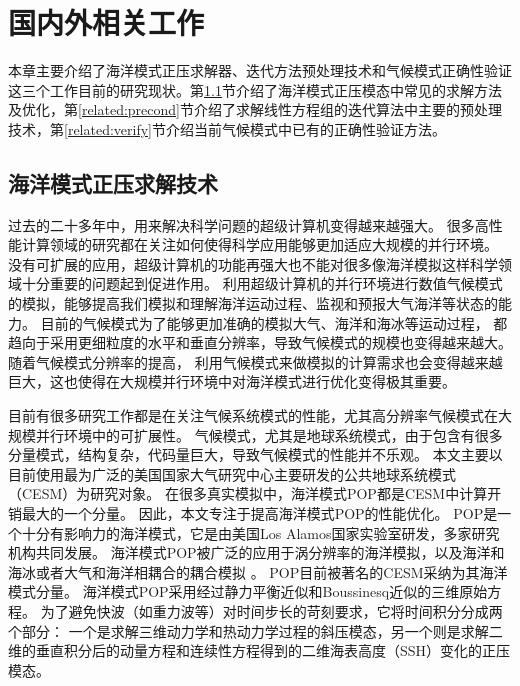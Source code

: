 \chapter{国内外相关工作}
\label{cha:related}
本章主要介绍了海洋模式正压求解器、迭代方法预处理技术和气候模式正确性验证这三个工作目前的研究现状。第\ref{solver:Backgroud}节介绍了海洋模式正压模态中常见的求解方法及优化，第\ref{related:precond}节介绍了求解线性方程组的迭代算法中主要的预处理技术，第\ref{related:verify}节介绍当前气候模式中已有的正确性验证方法。


\section{海洋模式正压求解技术}
\label{solver:Backgroud} 

过去的二十多年中，用来解决科学问题的超级计算机变得越来越强大。 
很多高性能计算领域的研究都在关注如何使得科学应用能够更加适应大规模的并行环境\cite{hu2013scalable}。 
没有可扩展的应用，超级计算机的功能再强大也不能对很多像海洋模拟这样科学领域十分重要的问题起到促进作用。 
利用超级计算机的并行环境进行数值气候模式的模拟，能够提高我们模拟和理解海洋运动过程、监视和预报大气海洋等状态的能力。
目前的气候模式为了能够更加准确的模拟大气、海洋和海冰等运动过程， 都趋向于采用更细粒度的水平和垂直分辨率，导致气候模式的规模也变得越来越大。 
随着气候模式分辨率的提高， 利用气候模式来做模拟的计算需求也会变得越来越巨大，这也使得在大规模并行环境中对海洋模式进行优化变得极其重要。 



目前有很多研究工作都是在关注气候系统模式的性能，尤其高分辨率气候模式在大规模并行环境中的可扩展性。 
气候模式，尤其是地球系统模式，由于包含有很多分量模式，结构复杂，代码量巨大，导致气候模式的性能并不乐观。 
本文主要以目前使用最为广泛的美国国家大气研究中心主要研发的公共地球系统模式（CESM）为研究对象。
在很多真实模拟中，海洋模式POP都是CESM中计算开销最大的一个分量\cite{Worley:2011:PCE:2063384.2063457, dennis2012computational}。 
因此，本文专注于提高海洋模式POP的性能优化。 
POP是一个十分有影响力的海洋模式，它是由美国Los Alamos国家实验室研发，多家研究机构共同发展。
海洋模式POP被广泛的应用于涡分辨率的海洋模拟\cite{mcclean2002eulerian, stark2004towards}，以及海洋和海冰或者大气和海洋相耦合的耦合模拟  \cite{May2002preliminary}。 
POP目前被著名的CESM采纳为其海洋模式分量。  
海洋模式POP采用经过静力平衡近似和Boussinesq近似的三维原始方程。 
为了避免快波（如重力波等）对时间步长的苛刻要求，它将时间积分分成两个部分： 一个是求解三维动力学和热动力学过程的斜压模态，另一个则是求解二维的垂直积分后的动量方程和连续性方程得到的二维海表高度（SSH）变化的正压模态\cite{smith2010parallel}。

